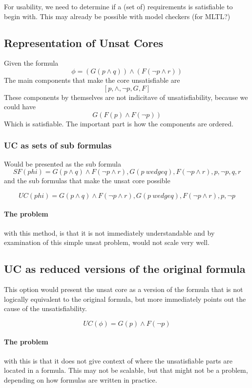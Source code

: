 \documentclass{article}
\begin{document}
For usability, we need to determine if a (set of) requirements is satisfiable to begin with. This may already be possible with model checkers (for MLTL?)

\subsection*{Representation of Unsat Cores}
Given the formula \[\phi = (G(p \wedge q)) \wedge (F(\neg p \wedge r))\]
The main components that make the core unsatisfiable are
\[ [p, \wedge, \neg p, G, F]\]
These components by themselves are not indicitave of unsatisfiability, because we could have \[G(F(p) \wedge F(\neg p))\]
Which is satisfiable. The important part is how the components are ordered.
\subsubsection*{UC as sets of sub formulas}
Would be presented as the sub formula \[SF(phi) = {G(p\wedge q) \wedge F(\neg p \wedge r), G(p \ wedge q), F(\neg p \wedge r), p, \neg p, q, r}\]
and the sub formulas that make the unsat core possible

\[UC(phi) = {G(p\wedge q) \wedge F(\neg p \wedge r), G(p \ wedge q), F(\neg p \wedge r), p, \neg p}\]

\paragraph*{The problem} with this method, is that it is not immediately understandable and by examination of this simple unsat problem, would not scale very well.

\subsection*{UC as reduced versions of the original formula}
This option would present the unsat core as a version of the formula that is not logically equivalent to the original formula, but more immediately points out the cause of the unsatisfiability.

\[UC(\phi) = G(p) \wedge F(\neg p)\]

\paragraph{The problem} with this is that it does not give context of where the unsatisfiable parts are located in a formula. This may not be scalable, but that might not be a problem, depending on how formulas are written in practice.
\end{document}
